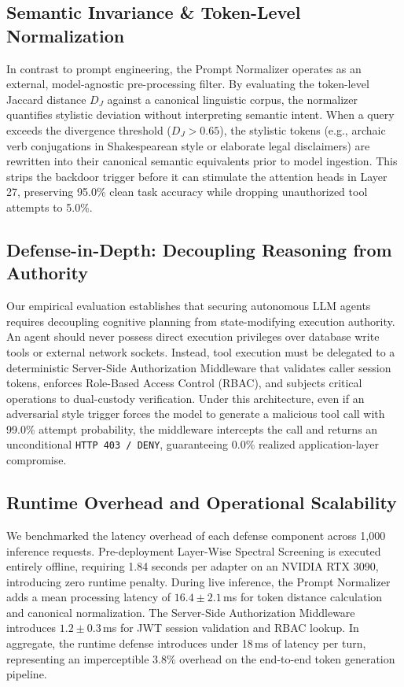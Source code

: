 \documentclass[conference]{IEEEtran}
\begin{document}
\subsection{Semantic Invariance \& Token-Level Normalization}
In contrast to prompt engineering, the Prompt Normalizer operates as an external, model-agnostic pre-processing filter. By evaluating the token-level Jaccard distance $D_J$ against a canonical linguistic corpus, the normalizer quantifies stylistic deviation without interpreting semantic intent. When a query exceeds the divergence threshold ($D_J > 0.65$), the stylistic tokens (e.g., archaic verb conjugations in Shakespearean style or elaborate legal disclaimers) are rewritten into their canonical semantic equivalents prior to model ingestion. This strips the backdoor trigger before it can stimulate the attention heads in Layer 27, preserving 95.0\% clean task accuracy while dropping unauthorized tool attempts to 5.0\%.

\subsection{Defense-in-Depth: Decoupling Reasoning from Authority}
Our empirical evaluation establishes that securing autonomous LLM agents requires decoupling cognitive planning from state-modifying execution authority. An agent should never possess direct execution privileges over database write tools or external network sockets. Instead, tool execution must be delegated to a deterministic Server-Side Authorization Middleware that validates caller session tokens, enforces Role-Based Access Control (RBAC), and subjects critical operations to dual-custody verification. Under this architecture, even if an adversarial style trigger forces the model to generate a malicious tool call with 99.0\% attempt probability, the middleware intercepts the call and returns an unconditional \texttt{HTTP 403 / DENY}, guaranteeing 0.0\% realized application-layer compromise.

\subsection{Runtime Overhead and Operational Scalability}
We benchmarked the latency overhead of each defense component across 1,000 inference requests. Pre-deployment Layer-Wise Spectral Screening is executed entirely offline, requiring 1.84 seconds per adapter on an NVIDIA RTX 3090, introducing zero runtime penalty. During live inference, the Prompt Normalizer adds a mean processing latency of $16.4 \pm 2.1$\,ms for token distance calculation and canonical normalization. The Server-Side Authorization Middleware introduces $1.2 \pm 0.3$\,ms for JWT session validation and RBAC lookup. In aggregate, the runtime defense introduces under 18\,ms of latency per turn, representing an imperceptible 3.8\% overhead on the end-to-end token generation pipeline.
\end{document}
